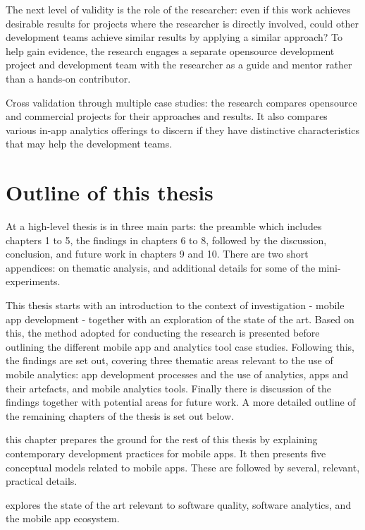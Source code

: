 The next level of validity is the role of the researcher: even if this work achieves desirable results for projects where the researcher is directly involved, could other development teams achieve similar results by applying a similar approach? To help gain evidence, the research engages a separate opensource development project and development team with the researcher as a guide and mentor rather than a hands-on contributor.

Cross validation through multiple case studies: the research compares opensource and commercial projects for their approaches and results. It also compares various in-app analytics offerings to discern if they have distinctive characteristics that may help the development teams.



\section{Outline of this thesis}
At a high-level thesis is in three main parts: the preamble which includes chapters 1 to 5, the findings in chapters 6 to 8, followed by the discussion, conclusion, and future work in chapters 9 and 10. There are two short appendices: on thematic analysis, and additional details for some of the mini-experiments.

\bigskip

This thesis starts with an introduction to the context of investigation - mobile app development - together with an exploration of the state of the art. Based on this, the method adopted for conducting the research is presented before outlining the different mobile app and analytics tool case studies. Following this, the findings are set out, covering three thematic areas relevant to the use of mobile analytics: app development processes and the use of analytics, apps and their artefacts, and mobile analytics tools. Finally there is discussion of the findings together with potential areas for future work. A more detailed outline of the remaining chapters of the thesis is set out below.

 this chapter prepares the ground for the rest of this thesis by explaining contemporary development practices for mobile apps. It then presents five conceptual models related to mobile apps. These are followed by several, relevant, practical details.

 explores the state of the art relevant to software quality, software analytics, and the mobile app ecosystem.

